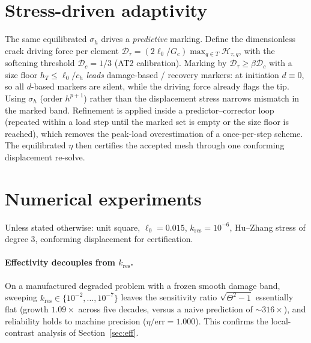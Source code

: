 \documentclass[11pt]{article}
\newcommand{\kres}{k_{\mathrm{res}}}
\begin{document}
\section{Stress-driven adaptivity}\label{sec:adapt}
The same equilibrated $\sigma_h$ drives a \emph{predictive} marking. Define the
dimensionless crack driving force per element
$\mathcal D_\tau=(2\ell_0/G_c)\max_{q\in T}\mathcal H_{\tau,q}$, with the
softening threshold $\mathcal D_c=1/3$ (AT2 calibration). Marking by
$\mathcal D_\tau\ge\beta\mathcal D_c$ with a size floor $h_T\le\ell_0/c_h$
\emph{leads} damage-based / recovery markers: at initiation $d\equiv0$, so all
$d$-based markers are silent, while the driving force already flags the tip.
Using $\sigma_h$ (order $h^{p+1}$) rather than the displacement stress narrows
mismatch in the marked band. Refinement is applied inside a
predictor--corrector loop (repeated within a load step until the marked set is
empty or the size floor is reached), which removes the peak-load overestimation
of a once-per-step scheme. The equilibrated $\eta$ then certifies the accepted
mesh through one conforming displacement re-solve.

\section{Numerical experiments}\label{sec:num}
Unless stated otherwise: unit square, $\ell_0=0.015$, $\kres=10^{-6}$,
Hu--Zhang stress of degree $3$, conforming displacement for certification.

\paragraph{Effectivity decouples from $\kres$.}
On a manufactured degraded problem with a frozen smooth damage band, sweeping
$\kres\in\{10^{-2},\dots,10^{-7}\}$ leaves the sensitivity ratio
$\sqrt{\Theta^2-1}$ essentially flat (growth $1.09\times$ across five decades,
versus a naive prediction of $\sim\!316\times$), and reliability holds to
machine precision ($\eta/\mathrm{err}=1.000$). This confirms the local-contrast
analysis of Section~\ref{sec:eff}.
\end{document}
